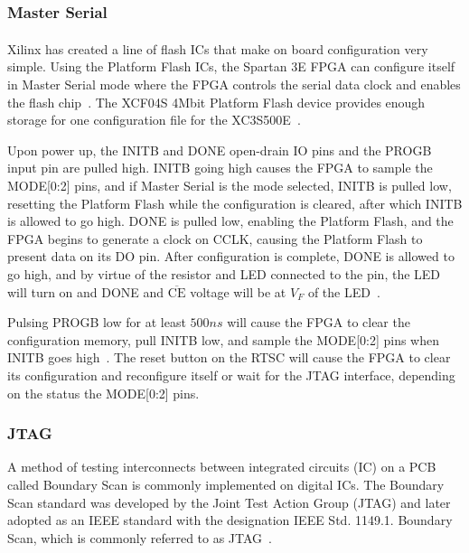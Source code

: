 \subsubsection{Master Serial}

Xilinx\textsuperscript{\textregistered}  has created a line of flash ICs that make on board configuration very simple.  Using the Platform Flash ICs, the Spartan 3E FPGA can configure itself in Master Serial mode where the FPGA controls the serial data clock and enables the flash chip~\cite{Spartan3ConfigUG}.  The XCF04S 4Mbit Platform Flash device provides enough storage for one configuration file for the XC3S500E~\cite{Spartan3ConfigUG}.

Upon power up, the INIT\textunderscore B and DONE open-drain IO pins and the PROG\textunderscore B input pin are pulled high.  INIT\textunderscore B going high causes the FPGA to sample the MODE[0:2] pins, and if Master Serial is the mode selected, INIT\textunderscore B is pulled low, resetting the Platform Flash while the configuration is cleared, after which INIT\textunderscore B is allowed to go high.  DONE is pulled low, enabling the Platform Flash, and the FPGA begins to generate a clock on CCLK, causing the Platform Flash to present data on its DO pin.  After configuration is complete, DONE is allowed to go high, and by virtue of the resistor and LED connected to the pin, the LED will turn on and DONE and $\overline{\mathrm{CE}}$ voltage will be at $\unit{V} _ {\unit{F}}$ of the LED~\cite{Spartan3ConfigUG}.

Pulsing PROG\textunderscore B low for at least $500\unit{ns}$ will cause the FPGA to clear the configuration memory, pull INIT\textunderscore B low, and sample the MODE[0:2] pins when INIT\textunderscore B goes high~\cite{Spartan3ConfigUG}.  The reset button on the RTSC will cause the FPGA to clear its configuration and reconfigure itself or wait for the JTAG interface, depending on the status the MODE[0:2] pins.


\subsubsection{JTAG}

A method of testing interconnects between integrated circuits (IC) on a PCB called Boundary Scan is commonly implemented on digital ICs.  The Boundary Scan standard was developed by the Joint Test Action Group (JTAG) and later adopted as an IEEE standard with the designation IEEE Std. 1149.1.  Boundary Scan, which is commonly referred to as JTAG~\cite{CorelisJTAG}.

